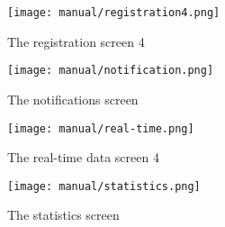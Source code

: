 \begin{figure}[ht!]
\centering
\begin{minipage}{.5\textwidth}
  \centering
  \texttt{[image: manual/registration4.png]}
  \caption{\label{fig:vitals}The registration screen 4}

\end{minipage}%
\begin{minipage}{.5\textwidth}
  \centering
  \texttt{[image: manual/notification.png]}
  \caption{\label{fig:statistic}The notifications screen}
\end{minipage}
\end{figure}

\begin{figure}[ht!]
\centering
\begin{minipage}{.5\textwidth}
  \centering
  \texttt{[image: manual/real-time.png]}
  \caption{\label{fig:vitals}The real-time data screen 4}

\end{minipage}%
\begin{minipage}{.5\textwidth}
  \centering
  \texttt{[image: manual/statistics.png]}
  \caption{\label{fig:statistic}The statistics screen}
\end{minipage}
\end{figure}
